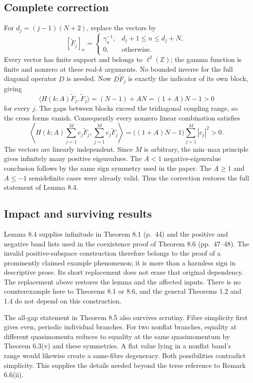\documentclass[10pt]{article}
\begin{document}
\subsection*{Complete correction}
For \(d_j=(j-1)(N+2)\), replace the vectors by \[[\widetilde F_j]_n=
 \begin{cases}
 \gamma_n^{-1},&d_j+1\le n\le d_j+N,\\
 0,&\text{otherwise}.
 \end{cases}\] Every vector has finite support and belongs to \(\ell^2(\mathbb Z)\); the gamma function is finite and nonzero at these real-\(k\) arguments. No bounded inverse for the full diagonal operator \(D\) is needed. Now \(D\widetilde F_j\) is exactly the indicator of its own block, giving \[\langle H(k;A)\widetilde F_j,\widetilde F_j\rangle
   =(N-1)+AN=(1+A)N-1>0\] for every \(j\). The gaps between blocks exceed the tridiagonal coupling range, so the cross forms vanish. Consequently every nonzero linear combination satisfies \[\left\langle H(k;A)\sum_{j=1}^M c_j\widetilde F_j,
                  \sum_{j=1}^M c_j\widetilde F_j\right\rangle
 =\big((1+A)N-1\big)\sum_{j=1}^M|c_j|^2>0.\] The vectors are linearly independent. Since \(M\) is arbitrary, the min–max principle gives infinitely many positive eigenvalues. The \(A<1\) negative-eigenvalue conclusion follows by the same sign symmetry used in the paper. The \(A\ge1\) and \(A\le-1\) semidefinite cases were already valid. Thus the correction restores the full statement of Lemma 8.4.\par
\subsection*{Impact and surviving results}
Lemma 8.4 supplies infinitude in Theorem 8.1 (p. 44) and the positive and negative band lists used in the coexistence proof of Theorem 8.6 (pp. 47–48). The invalid positive-subspace construction therefore belongs to the proof of a prominently claimed example phenomenon; it is more than a harmless sign in descriptive prose. Its short replacement does not erase that original dependency. The replacement above restores the lemma and the affected inputs. There is no counterexample here to Theorems 8.1 or 8.6, and the general Theorems 1.2 and 1.4 do not depend on this construction.\par
The all-gap statement in Theorem 8.5 also survives scrutiny. Fibre simplicity first gives even, periodic individual branches. For two nonflat branches, equality at different quasimomenta reduces to equality at the same quasimomentum by Theorem 6.3(v) and these symmetries. A flat value lying in a nonflat band’s range would likewise create a same-fibre degeneracy. Both possibilities contradict simplicity. This supplies the details needed beyond the terse reference to Remark 6.6(ii).\par
\end{document}
